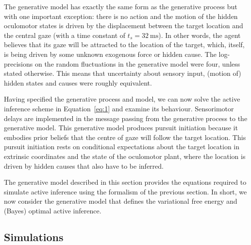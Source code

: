 \documentclass[a4paper]{article} %
\newcommand{\ms}{\si{\milli\second}}%
\begin{document}
The generative model has exactly the same form as the generative process
but with one important exception: there is no action and the motion of
the hidden oculomotor states is driven by the displacement between the
target location and the central gaze (with a time constant of $t_s=32~\ms$). In other words, the agent believes that its gaze will be
attracted to the location of the target, which, itself, is being driven
by some unknown exogenous force or hidden cause. The log-precisions on
the random fluctuations in the generative model were four, unless stated
otherwise. This means that uncertainty about sensory input, (motion of)
hidden states and causes were roughly equivalent.

Having specified the generative process and model, we can now solve the
active inference scheme in Equation~\ref{eq:1} and examine its behaviour.
Sensorimotor delays are implemented in the message passing from the
generative process to the generative model. This generative model
produces pursuit initiation because it embodies prior beliefs that the
centre of gaze will follow the target location. This pursuit initiation
rests on conditional expectations about the target location in extrinsic
coordinates and the state of the oculomotor plant, where the location is
driven by hidden causes that also have to be inferred.

The generative model described in this section provides the equations required to simulate active inference using the formalism of the previous section. In short, we now consider the generative model that defines the variational free energy and (Bayes) optimal active inference.

\subsection{Simulations}
\end{document}
